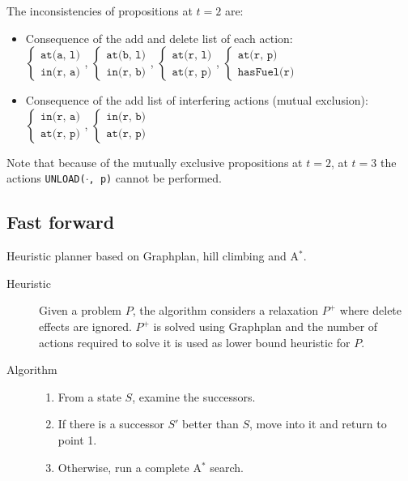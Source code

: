 \begin{example}
    The inconsistencies of propositions at $t=2$ are:
    \begin{itemize}
        \item Consequence of the add and delete list of each action:\\[0.3em]
            $\begin{cases}\texttt{at(a, l)} \\ \texttt{in(r, a)}\end{cases}$,
            $\begin{cases}\texttt{at(b, l)} \\ \texttt{in(r, b)}\end{cases}$,
            $\begin{cases}\texttt{at(r, l)} \\ \texttt{at(r, p)}\end{cases}$,
            $\begin{cases}\texttt{at(r, p)} \\ \texttt{hasFuel(r)}\end{cases}$\\[0.5em]
        \item Consequence of the add list of interfering actions (mutual exclusion):\\[0.3em]
            $\begin{cases}\texttt{in(r, a)} \\ \texttt{at(r, p)}\end{cases}$,
            $\begin{cases}\texttt{in(r, b)} \\ \texttt{at(r, p)}\end{cases}$
    \end{itemize}

    Note that because of the mutually exclusive propositions at $t=2$, 
    at $t=3$ the actions \texttt{UNLOAD($\cdot$, p)} cannot be performed.
\end{example}


\subsection{Fast forward}
Heuristic planner based on Graphplan, hill climbing and A$^*$.

\begin{description}
    \item[Heuristic]
        Given a problem $P$, the algorithm considers a relaxation $P^+$ 
        where delete effects are ignored.
        $P^+$ is solved using Graphplan and the number of actions required to solve it is used as lower bound heuristic for $P$.

    \item[Algorithm] \phantom{}
        \begin{enumerate}
            \item From a state $S$, examine the successors.
            \item If there is a successor $S'$ better than $S$, move into it and return to point 1.
            \item Otherwise, run a complete A$^*$ search.
        \end{enumerate}
\end{description}
